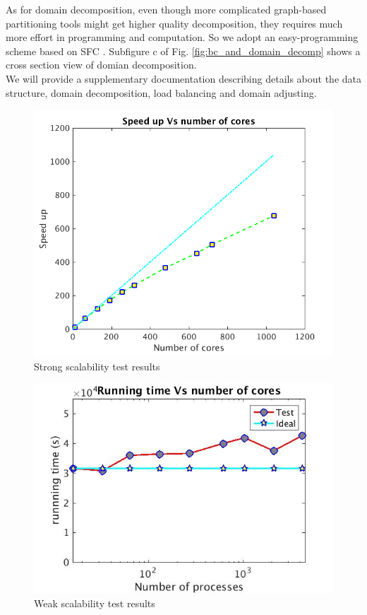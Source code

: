 \documentclass[journal abbreviation, manuscript]{copernicus}
\begin{document}
As for domain decomposition, even though more complicated graph-based partitioning tools \citep {biswas1999experiments} might get higher quality decomposition, they requires much more effort in programming and computation. So we adopt an easy-programming scheme based on SFC \citep {patra1999efficient}. Subfigure c of Fig. \ref{fig:bc_and_domain_decomp} shows a cross section view of domian decomposition.\\
We will provide a supplementary documentation describing details about the data structure, domain decomposition, load balancing and domain adjusting.\\
\begin{figure}[!t]
\centering
\includegraphics[scale=0.35]{strong}
\caption{Strong scalability test results}
\label{fig:strong_scale}
\end{figure}
%
\begin{figure}[!t]
\centering
\includegraphics[scale=0.35]{weak_scale}
\caption{Weak scalability test results}
\label{fig:weak_scale}
\end{figure}
\end{document}
